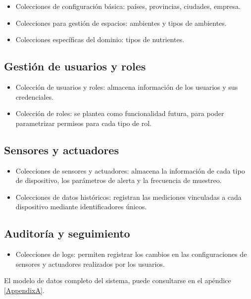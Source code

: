 \begin{itemize}
    \item Colecciones de configuración básica: países, provincias, ciudades, empresa.
    \item Colecciones para gestión de espacios: ambientes y tipos de ambientes.
    \item Colecciones específicas del dominio: tipos de nutrientes.
\end{itemize}

\subsection{Gestión de usuarios y roles}

\begin{itemize}
    \item Colección de usuarios y roles: almacena información de los usuarios y sus
          credenciales.
    \item Colección de roles: se plantea como funcionalidad futura, para poder
          parametrizar permisos para cada tipo de rol.
\end{itemize}

\subsection{Sensores y actuadores}
\begin{itemize}
    \item Colecciones de sensores y actuadores: almacena la información de cada tipo de
          dispositivo, los parámetros de alerta y la frecuencia de muestreo.
    \item Colecciones de datos históricos: registran las mediciones vinculadas a cada
          dispositivo mediante identificadores únicos.
\end{itemize}

\subsection{Auditoría y seguimiento}
\begin{itemize}
    \item Colecciones de logs: permiten registrar los cambios en las configuraciones de
          sensores y actuadores realizados por los usuarios.
\end{itemize}

El modelo de datos completo del sistema, puede consultarse en el apéndice
\ref{AppendixA}.

